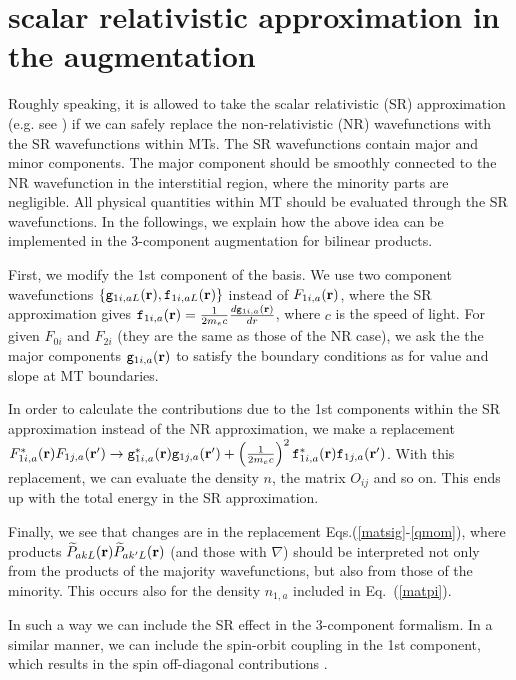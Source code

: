 \documentclass[twocolumn,showpacs,preprintnumbers,amsmath,amssymb,floatfix]{revtex4-1}
\newcommand{\bfr}{{\bf r}}
\newcommand{\req}[1]{\mbox{Eq.~\!(\ref{#1})}}
\begin{document}
\section{scalar relativistic approximation in the augmentation}
\label{app:srel}
Roughly speaking, it is allowed to take the scalar relativistic
(SR) approximation (e.g. see \cite{rmartinbook}) if we can safely replace the
non-relativistic (NR) wavefunctions with the SR wavefunctions within MTs.
The SR wavefunctions contain major and minor components. 
The major component should be smoothly connected to the NR wavefunction in 
the interstitial region, where the minority parts are negligible. 
All physical quantities within MT should be evaluated 
through the SR wavefunctions.
In the followings, we explain how the above idea can be implemented in the
3-component augmentation for bilinear products. 

First, we modify the 1st component of the basis. 
We use two component wavefunctions $\{{\mathtt g}_{1i,aL}(\bfr),{\mathtt f}_{1i,aL}(\bfr)\}$
instead of $F_{1i,a}(\bfr)$, where the SR approximation gives
${\mathtt f}_{1i,a}(\bfr)=\frac{1}{2m_e c} \frac{d {\mathtt g}_{1i,a}(\bfr)}{dr}$, 
where $c$ is the speed of light. 
For given $F_{0i}$ and $F_{2i}$ (they are the same as those of the NR case),
we ask the the major components ${\mathtt g}_{1i,a}(\bfr)$
to satisfy the boundary conditions as for value and slope at MT boundaries.

In order to calculate the contributions due to the 1st components within the SR approximation
instead of the NR approximation, we make a replacement 
$F^*_{1i,a}(\bfr)F_{1j,a}(\bfr') \rightarrow 
 {\mathtt g}^*_{1i,a}(\bfr){\mathtt g}_{1j,a}(\bfr')
+\left(\frac{1}{2m_e c}\right)^2 
 {\mathtt f}^*_{1i,a}(\bfr){\mathtt f}_{1j,a}(\bfr')$.
With this replacement, we can evaluate the density $n$, the matrix $O_{ij}$ 
and so on. This ends up with the total energy in the SR approximation.

Finally, we see that changes are in the replacement Eqs.(\ref{matsig}-\ref{qmom}),
where products $\widetilde{P}_{akL}(\bfr) \widetilde{P}_{ak'L}(\bfr)$ 
(and those with $\nabla$) should be interpreted not only from the products 
of the majority wavefunctions, but also from those of the minority.
This occurs also for the density $n_{1,a}$ included in \req{matpi}.

In such a way we can include the SR effect in the 3-component formalism.
In a similar manner, we can include the spin-orbit coupling in the 1st component, 
which results in the spin off-diagonal contributions \cite{chantis06a}.
\end{document}

